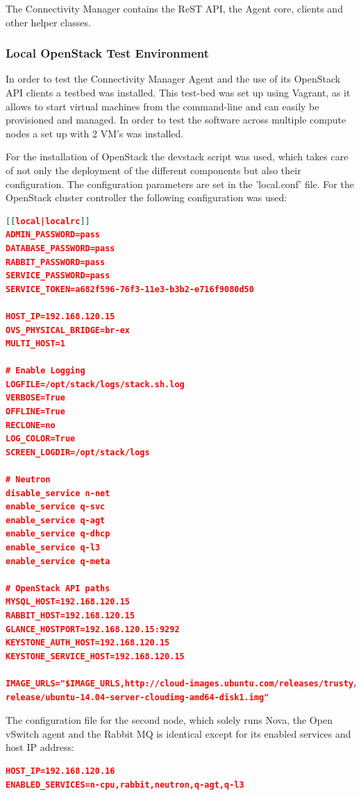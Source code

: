 The Connectivity Manager contains the ReST API, the Agent core, clients and other helper classes.

\subsubsection{Local OpenStack Test Environment}

In order to test the Connectivity Manager Agent and the use of its OpenStack API clients a testbed was installed. This test-bed was set up using Vagrant, as it allows to start virtual machines from the command-line and can easily be provisioned and managed. In order to test the software across multiple compute nodes a set up with 2 VM's was installed.

For the installation of OpenStack the devstack script was used, which takes care of not only the deployment of the different components but also their configuration. The configuration parameters are set in the 'local.conf' file. For the OpenStack cluster controller the following configuration was used:

\begin{lstlisting}[language=json]
[[local|localrc]]
ADMIN_PASSWORD=pass
DATABASE_PASSWORD=pass
RABBIT_PASSWORD=pass
SERVICE_PASSWORD=pass
SERVICE_TOKEN=a682f596-76f3-11e3-b3b2-e716f9080d50

HOST_IP=192.168.120.15
OVS_PHYSICAL_BRIDGE=br-ex
MULTI_HOST=1

# Enable Logging
LOGFILE=/opt/stack/logs/stack.sh.log
VERBOSE=True
OFFLINE=True
RECLONE=no
LOG_COLOR=True
SCREEN_LOGDIR=/opt/stack/logs

# Neutron
disable_service n-net
enable_service q-svc
enable_service q-agt
enable_service q-dhcp
enable_service q-l3
enable_service q-meta

# OpenStack API paths
MYSQL_HOST=192.168.120.15
RABBIT_HOST=192.168.120.15
GLANCE_HOSTPORT=192.168.120.15:9292
KEYSTONE_AUTH_HOST=192.168.120.15
KEYSTONE_SERVICE_HOST=192.168.120.15

IMAGE_URLS="$IMAGE_URLS,http://cloud-images.ubuntu.com/releases/trusty/
release/ubuntu-14.04-server-cloudimg-amd64-disk1.img"
\end{lstlisting}

The configuration file for the second node, which solely runs Nova, the Open vSwitch agent and the Rabbit MQ is identical except for its enabled services and host IP address:

\begin{lstlisting}[language=json]
HOST_IP=192.168.120.16
ENABLED_SERVICES=n-cpu,rabbit,neutron,q-agt,q-l3
\end{lstlisting}


